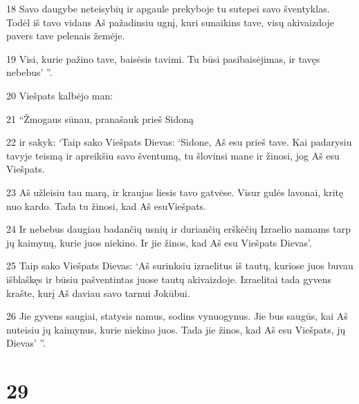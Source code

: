 \par 18 Savo daugybe neteisybių ir apgaule prekyboje tu sutepei savo šventyklas. Todėl iš tavo vidaus Aš pažadinsiu ugnį, kuri sunaikins tave, visų akivaizdoje pavers tave pelenais žemėje. 
\par 19 Visi, kurie pažino tave, baisėsis tavimi. Tu būsi pasibaisėjimas, ir tavęs nebebus’ ”. 
\par 20 Viešpats kalbėjo man: 
\par 21 “Žmogaus sūnau, pranašauk prieš Sidoną 
\par 22 ir sakyk: ‘Taip sako Viešpats Dievas: ‘Sidone, Aš esu prieš tave. Kai padarysiu tavyje teismą ir apreikšiu savo šventumą, tu šlovinsi mane ir žinosi, jog Aš esu Viešpats. 
\par 23 Aš užleisiu tau marą, ir kraujas liesis tavo gatvėse. Visur gulės lavonai, kritę nuo kardo. Tada tu žinosi, kad Aš esuViešpats. 
\par 24 Ir nebebus daugiau badančių usnių ir duriančių erškėčių Izraelio namams tarp jų kaimynų, kurie juos niekino. Ir jie žinos, kad Aš esu Viešpats Dievas’. 
\par 25 Taip sako Viešpats Dievas: ‘Aš surinksiu izraelitus iš tautų, kuriose juos buvau išblaškęs ir būsiu pašventintas juose tautų akivaizdoje. Izraelitai tada gyvens krašte, kurį Aš daviau savo tarnui Jokūbui. 
\par 26 Jie gyvens saugiai, statysis namus, sodins vynuogynus. Jie bus saugūs, kai Aš nuteisiu jų kaimynus, kurie niekino juos. Tada jie žinos, kad Aš esu Viešpats, jų Dievas’ ”.



\chapter{29}


